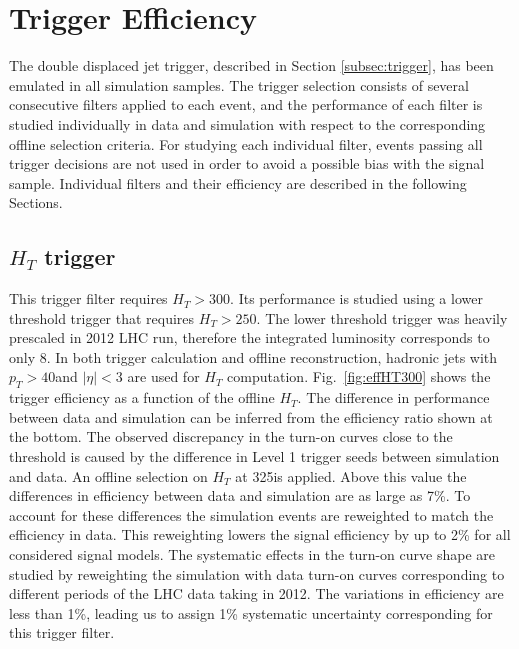 \section{Trigger Efficiency}
\label{sec:trigeff}

The double displaced jet trigger, described
in Section \ref{subsec:trigger}, has been emulated in all
 simulation samples. The trigger selection consists of several consecutive filters applied to each event, 
and the performance of each filter is studied individually in data and simulation with respect to 
the corresponding offline selection criteria. For studying each individual filter, events 
passing all trigger decisions 
are not used in order to avoid a possible bias with the signal sample. Individual filters and their efficiency are
described in the following Sections.  

\subsection{$H_T$ trigger}
\label{subsec:trigHT}
This trigger filter requires $H_T > 300$\GeV. Its performance is studied using a lower threshold trigger that 
requires $H_T >250$\GeV. 
The lower threshold trigger was heavily prescaled in 2012 LHC run, therefore the integrated luminosity corresponds to only 8\pbinv. 
In both trigger calculation and offline reconstruction, hadronic jets with $p_T>40$\GeV and $|\eta|<3$ are used
 for $H_T$ computation. 
Fig.~\ref{fig:effHT300} shows the trigger efficiency as a function of the offline $H_T$. 
The difference in performance between data and simulation can be inferred from the efficiency ratio 
shown at the bottom. The observed discrepancy in the turn-on curves close to the threshold is caused by the 
difference in Level 1 trigger seeds between simulation and data.
An offline selection on 
$H_T$ at 325\GeV is applied. 
Above this value the differences in efficiency between data and simulation are as large as
7\%. To account for these differences the simulation events are reweighted to match the efficiency in data.
This reweighting
lowers the signal efficiency by up to 2\% for all considered signal models. The systematic effects in the turn-on
curve shape are studied by reweighting the simulation with data turn-on curves corresponding to
 different periods of the LHC data taking in 2012. The variations in efficiency are 
less than 1\%, leading us to assign 1\% 
systematic uncertainty corresponding for this trigger filter.      

